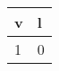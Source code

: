 \documentclass{article}[12pt]
\begin{document}
\centering
\begin{tabular}{ll}
v&l\\
\hline
1&0
\end{tabular}

  
\end{document}
